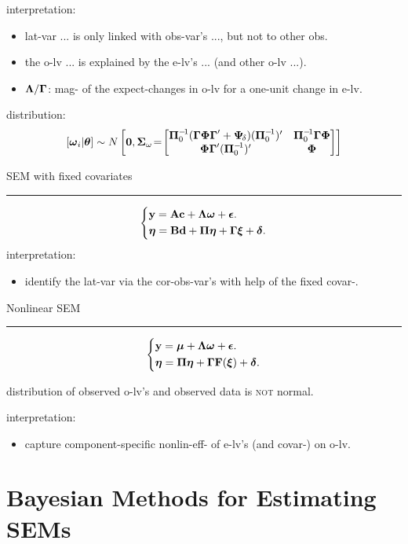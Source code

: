 interpretation: \begin{itemize}
    \item lat-var ... is only linked with obs-var's ..., but not to other obs.
    \item the o-lv ... is explained by the e-lv's ... (and other o-lv ...).
    \item $\boldsymbol{\Lambda} / \boldsymbol{\Gamma}$: mag- of the expect-changes in o-lv for a one-unit change in e-lv.
\end{itemize}

distribution: 
\[
    [\boldsymbol{\omega}_i \vert \boldsymbol{\theta}] 
    \sim {N}\left[
        \mathbf{0}
    , 
        \boldsymbol{\Sigma}_{\omega} \!=\! 
        \begin{bmatrix}
        \boldsymbol{\Pi}_0^{-\!1} (\boldsymbol{\Gamma} \boldsymbol{\Phi} \boldsymbol{\Gamma}'   + \boldsymbol{\Psi}_{\!\delta}) (\boldsymbol{\Pi}_0^{-\!1})' 
        & \boldsymbol{\Pi}_0^{-\!1} \boldsymbol{\Gamma} \boldsymbol{\Phi} \\
        \boldsymbol{\Phi} \boldsymbol{\Gamma}' (\boldsymbol{\Pi}_0^{-\!1})'
        & \boldsymbol{\Phi}\\
    \end{bmatrix}
    \right]
\]

SEM with fixed covariates \phantom{g} \hrule
    \[
        \begin{dcases}
            \mathbf{y} = \mathbf{A} \mathbf{c} + \boldsymbol{\Lambda} \boldsymbol{\omega} + \boldsymbol{\epsilon}. \\
            \boldsymbol{\eta} = \mathbf{B}\mathbf{d} + \boldsymbol{\Pi} \boldsymbol{\eta} + \boldsymbol{\Gamma} \boldsymbol{\xi} + \boldsymbol{\delta}.
        \end{dcases}
    \]
interpretation:
\begin{itemize}
    \item identify the lat-var via the cor-obs-var's with help of the fixed covar-.
\end{itemize}

Nonlinear SEM \phantom{g} \hrule
    \[
        \begin{dcases}
            \mathbf{y} = \boldsymbol{\mu} + \boldsymbol{\Lambda} \boldsymbol{\omega} + \boldsymbol{\epsilon}. \\
            \boldsymbol{\eta} = \boldsymbol{\Pi} \boldsymbol{\eta} + \boldsymbol{\Gamma} \mathbf{F}(\boldsymbol{\xi}) + \boldsymbol{\delta}.
        \end{dcases}
    \]

distribution of observed o-lv's and observed data is \textsc{not} normal.

interpretation:\begin{itemize}
    \item capture component-specific nonlin-eff- of e-lv's (and covar-) on o-lv.
\end{itemize}


\vspace{-1em}

\section*{Bayesian Methods for Estimating SEMs}

